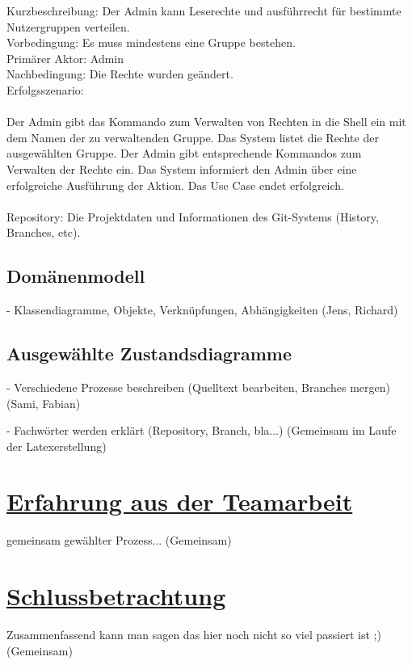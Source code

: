 \documentclass[a4paper]{article}
\begin{document}
Kurzbeschreibung: 	Der Admin kann Leserechte und ausführrecht für bestimmte Nutzergruppen verteilen.\\
Vorbedingung:	Es muss mindestens eine Gruppe bestehen. \\
Primärer Aktor:	Admin\\
Nachbedingung:	Die Rechte wurden geändert. \\
Erfolgsszenario:\\
\\
Der Admin gibt das Kommando zum Verwalten von Rechten in die Shell ein mit dem Namen der zu verwaltenden Gruppe. Das System listet die Rechte der ausgewählten Gruppe. Der Admin gibt entsprechende Kommandos zum Verwalten der Rechte ein. Das System informiert den Admin über eine erfolgreiche Ausführung der Aktion. Das Use Case endet erfolgreich.\\
\\

Repository: Die Projektdaten und Informationen des Git-Systems (History, Branches, etc).
\newpage	
\subsection{Domänenmodell}

	  - Klassendiagramme, Objekte, Verknüpfungen, Abhängigkeiten (Jens, Richard)
\newpage		
\subsection{Ausgewählte Zustandsdiagramme}

	 - Verschiedene Prozesse beschreiben (Quelltext bearbeiten, Branches mergen) (Sami, Fabian)
\newpage	

\printglossary[title={Glossar}, numberedsection]

	 - Fachwörter werden erklärt (Repository, Branch, bla...) (Gemeinsam im Laufe der Latexerstellung) 
\newpage		
\section{\underline{Erfahrung aus der Teamarbeit}}

	gemeinsam gewählter Prozess...
	(Gemeinsam)

\section{\underline{Schlussbetrachtung}}
	
	Zusammenfassend kann man sagen das hier noch nicht so viel passiert ist ;)	
	(Gemeinsam)

	
\end{document}
